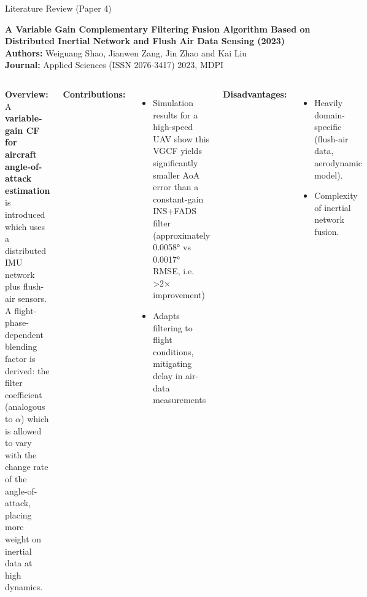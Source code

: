 \documentclass[aspectratio=169,xcolor=dvipsnames]{beamer}
\begin{document}
\begin{frame}{Literature Review (Paper 4)}
    
\textbf{A Variable Gain Complementary Filtering Fusion Algorithm Based on Distributed Inertial Network and Flush Air Data Sensing (2023)} \hfill \textcolor{blue}{\cite{shao2023variablegainflushsesnsing}}\\
\textbf{Authors:} Weiguang Shao, Jianwen Zang, Jin Zhao and Kai Liu\\
\textbf{Journal:} Applied Sciences (ISSN 2076-3417) 2023, MDPI

\vspace{1em}
\scriptsize
\begin{columns}
    \textbf{Overview:}\\
     A \textbf{variable-gain CF for aircraft angle-of-attack estimation} is introduced which uses a distributed IMU network plus flush-air sensors. A flight-phase-dependent blending factor is derived: the filter coefficient (analogous to $\alpha$) which is allowed to vary with the change rate of the angle-of-attack, placing more weight on inertial data at high dynamics. 

    \textbf{Contributions:}
    \begin{itemize}
        \item  Simulation results for a high-speed UAV show this VGCF yields significantly smaller AoA error than a constant-gain INS+FADS filter (approximately 0.0058° vs 0.0017° RMSE, i.e. >2× improvement)
        \item Adapts filtering to flight conditions, mitigating delay in air-data measurements
    \end{itemize}

    \vspace{0.5em}
    \textbf{Disadvantages:}
    \begin{itemize}
        \item Heavily domain-specific (flush-air data, aerodynamic model). 
        \item Complexity of inertial network fusion. 
    \end{itemize}
\end{columns}

\end{frame}
\end{document}
